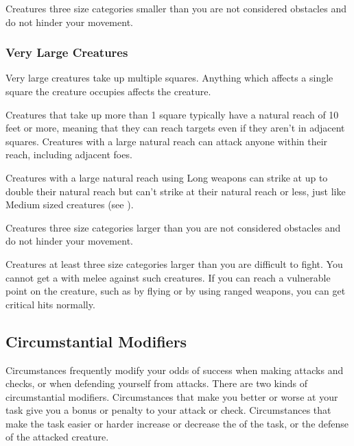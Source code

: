              Creatures three size categories smaller than you are not considered obstacles and do not hinder your movement.

        \subsubsection{Very Large Creatures}
             Very large creatures take up multiple squares. Anything which affects a single square the creature occupies affects the creature.

             Creatures that take up more than 1 square typically have a natural reach of 10 feet or more, meaning that they can reach targets even if they aren't in adjacent squares. Creatures with a large natural reach can attack anyone within their reach, including adjacent foes.

            Creatures with a large natural reach using Long weapons can strike at up to double their natural reach but can't strike at their natural reach or less, just like Medium sized creatures (see ).

             Creatures three size categories larger than you are not considered obstacles and do not hinder your movement.

             Creatures at least three size categories larger than you are difficult to fight. You cannot get a  with melee  against such creatures. If you can reach a vulnerable point on the creature, such as by flying or by using ranged weapons, you can get critical hits normally.

    \subsection{Circumstantial Modifiers}

        Circumstances frequently modify your odds of success when making attacks and checks, or when defending yourself from attacks.
        There are two kinds of circumstantial modifiers.
        Circumstances that make you better or worse at your task give you a bonus or penalty to your attack or check.
        Circumstances that make the task easier or harder increase or decrease the  of the task, or the defense of the attacked creature.

